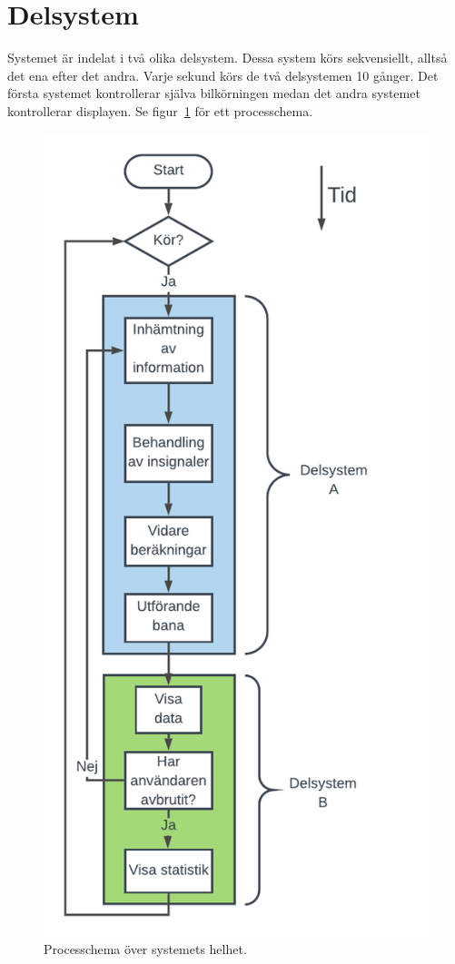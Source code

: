 \section{Delsystem}

Systemet är indelat i två olika delsystem. Dessa system körs sekvensiellt,
alltså det ena efter det andra. Varje sekund körs de två delsystemen 10 gånger.
Det första systemet kontrollerar själva bilkörningen medan det andra systemet
kontrollerar displayen. Se figur~\ref{fig:system_diagram} för ett processchema.

\begin{figure}
  \centering
  \includegraphics[width=\linewidth,height=0.9\textheight,keepaspectratio]{figures/Processchema.pdf}
  \caption{Processchema över systemets helhet.}%
  \label{fig:system_diagram}
\end{figure}

